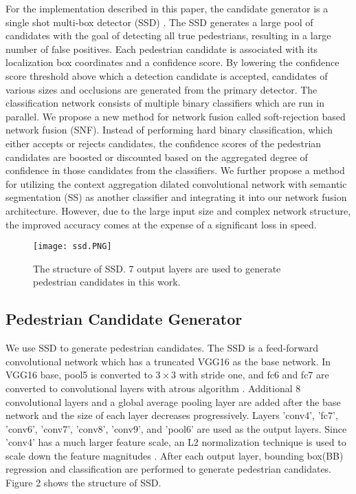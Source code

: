 \documentclass[10pt,letterpaper]{article}
\begin{document}
For the implementation described in this paper, the candidate generator is a single shot multi-box detector (SSD) \cite{SSD}. The SSD generates a large pool of candidates with the goal of detecting all true pedestrians, resulting in a large number of false positives. Each pedestrian candidate is associated with its localization box coordinates and a confidence score. By lowering the confidence score threshold above which a detection candidate is accepted, candidates of various sizes and occlusions are generated from the primary detector. The classification network consists of multiple binary classifiers which are run in parallel. We propose a new method for network fusion called soft-rejection based network fusion (SNF). Instead of performing hard binary classification, which either accepts or rejects candidates, the confidence scores of the pedestrian candidates are boosted or discounted based on the aggregated degree of confidence in those candidates from the classifiers. We further propose a method for utilizing the context aggregation dilated convolutional network with semantic segmentation (SS) as another classifier and integrating it into our network fusion architecture. However, due to the large input size and complex network structure, the improved accuracy comes at the expense of a significant loss in speed.

\begin{figure*}
\begin{center}
   \texttt{[image: ssd.PNG]}
\end{center}
   \caption{The structure of SSD. 7 output layers are used to generate pedestrian candidates in this work.}
\label{fig:short}
\end{figure*}

\subsection{Pedestrian Candidate Generator}
We use SSD to generate pedestrian candidates. The SSD is a feed-forward convolutional network which has a truncated VGG16 as the base network. In VGG16 base, pool5 is converted to $3\times 3$ with stride one, and fc6 and fc7 are converted to convolutional layers with atrous algorithm \cite{sspaper}. Additional 8 convolutional layers and a global average pooling layer are added after the base network and the size of each layer decreases progressively. Layers 'conv4', 'fc7', 'conv6', 'conv7', 'conv8', 'conv9', and 'pool6' are used as the output layers. Since 'conv4' has a much larger feature scale, an L2 normalization technique is used to scale down the feature magnitudes \cite{ParseNetLW}. After each output layer, bounding box(BB) regression and classification are performed  to generate pedestrian candidates. Figure 2 shows the structure of SSD.
\end{document}
